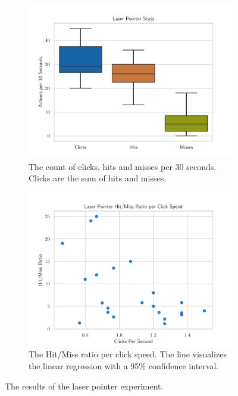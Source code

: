 \begin{figure}[H]
  \centering
  \begin{subfigure}{.48\textwidth}%
    \centering
    \includegraphics[width=\textwidth]{figures/evaluation/eval_exp_lp.pdf}
    \caption{The count of clicks, hits and misses per 30 seconds. Clicks are the sum of hits and misses.}\label{fig:eval-exp-lp}
  \end{subfigure}%
  \hspace{0.3\textwidth}%
  \begin{subfigure}{.48\textwidth}%
    \centering
    \includegraphics[width=\textwidth]{figures/evaluation/eval_exp_lp_ratio_scatter.pdf}
    \caption{The Hit/Miss ratio per click speed. The line visualizes the linear regression with a 95\% confidence interval.}\label{fig:eval-exp-lp-ratio-scatter}
  \end{subfigure}%
  \caption[Laser pointer experiment results]{The results of the laser pointer experiment.}\label{fig:exp-lp-eval}
\end{figure}


